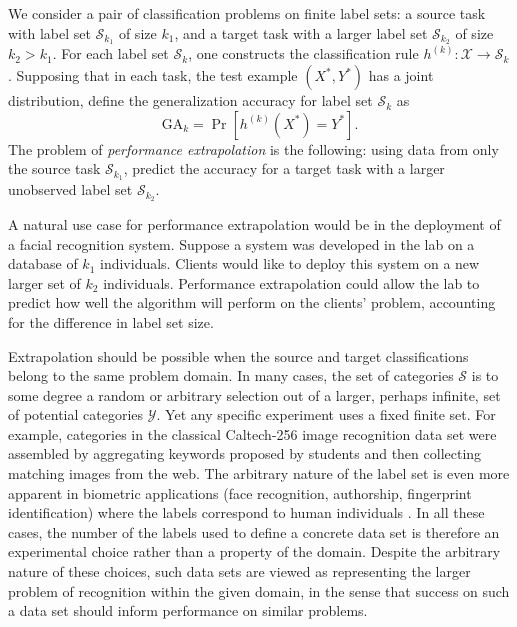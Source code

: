 \documentclass[twoside,11pt]{article}
\begin{document}
We consider a pair of classification problems on finite
label sets: a source task with label set $\mathcal{S}_{k_1}$ of size
$k_1$, and a target task with a larger label set $\mathcal{S}_{k_2}$
of size $k_2 > k_1$.  For each label set $\mathcal{S}_k$, one
constructs the classification rule $h^{(k)}:\mathcal{X} \to
\mathcal{S}_{k}$.  Supposing that in each task, the test example
$(X^*, Y^*)$ has a joint distribution, define the generalization
accuracy for label set $\mathcal{S}_k$ as
\begin{equation}\label{eq:ga_k}
\text{GA}_k = \Pr[h^{(k)}(X^*) = Y^*].
\end{equation}
The problem of \emph{performance extrapolation} is the following:
using data from only the source task $\mathcal{S}_{k_1}$,
predict the accuracy for a target task with a larger unobserved
label set $\mathcal{S}_{k_2}$.

A natural use case for performance extrapolation would be in the
deployment of a facial recognition system.  Suppose a system was
developed in the lab on a database of $k_1$ individuals. Clients would
like to deploy this system on a new larger set of $k_2$
individuals. Performance extrapolation could allow the lab to predict
how well the algorithm will perform on the clients' problem,
accounting for the difference in label set size.

Extrapolation should be possible when the source and target
classifications belong to the same problem domain.  In
many cases, the set of categories $\mathcal{S}$ is to some degree a
random or arbitrary selection out of a larger, perhaps infinite, set
of potential categories $\mathcal{Y}$. Yet any specific experiment
uses a fixed finite set.  For example, categories in the classical
Caltech-256 image recognition data set \citep{griffin2007caltech} were
assembled by aggregating keywords proposed by students and then
collecting matching images from the web.  The arbitrary nature of the
label set is even more apparent in biometric applications (face
recognition, authorship, fingerprint identification) where the labels
correspond to human individuals \citep{togneri2011overview,
  stamatatos2014overview}.  In all these cases, the number of the
labels used to define a concrete data set is therefore an experimental
choice rather than a property of the domain.  Despite the arbitrary
nature of these choices, such data sets are viewed as representing the
larger problem of recognition within the given domain, in the sense
that success on such a data set should inform performance on similar
problems.
\end{document}

